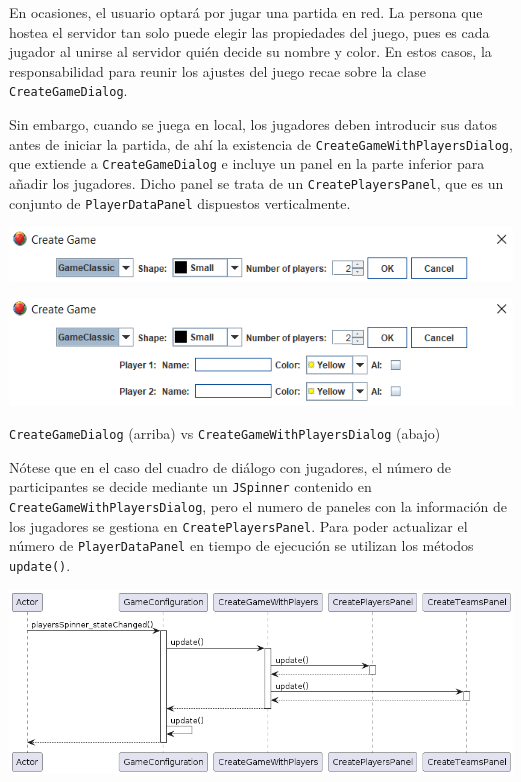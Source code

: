 \documentclass[12pt,a4paper,openright]{book}
\theoremstyle{break}
\begin{document}
En ocasiones, el usuario optará por jugar una partida en red. La persona que hostea el servidor tan solo puede elegir las propiedades del juego, pues es cada jugador al unirse al servidor quién decide su nombre y color. En estos casos, la responsabilidad para reunir los ajustes del juego recae sobre la clase \texttt{CreateGameDialog}.

Sin embargo, cuando se juega en local, los jugadores deben introducir sus datos antes de iniciar la partida, de ahí la existencia de \texttt{CreateGameWithPlayersDialog}, que extiende a \texttt{CreateGameDialog} e incluye un panel en la parte inferior para añadir los jugadores. Dicho panel se trata de un \texttt{CreatePlayersPanel}, que es un conjunto de \texttt{PlayerDataPanel} dispuestos verticalmente.

\begin{center}
\includegraphics[scale=0.65]{create-game-sprint6.png}
\end{center}

\begin{center}
\includegraphics[scale=0.65]{create-game-players-sprint6.png}

\texttt{CreateGameDialog} (arriba) vs \texttt{CreateGameWithPlayersDialog} (abajo)
\end{center}

Nótese que en el caso del cuadro de diálogo con jugadores, el número de participantes se decide mediante un \texttt{JSpinner} contenido en \texttt{CreateGameWithPlayersDialog}, pero el numero de paneles con la información de los jugadores se gestiona en \texttt{CreatePlayersPanel}. Para poder actualizar el número de \texttt{PlayerDataPanel} en tiempo de ejecución se utilizan los métodos \texttt{update()}.
\begin{center}
\includegraphics[scale=0.41]{updateGameConfig.png}
\end{center}
\end{document}
